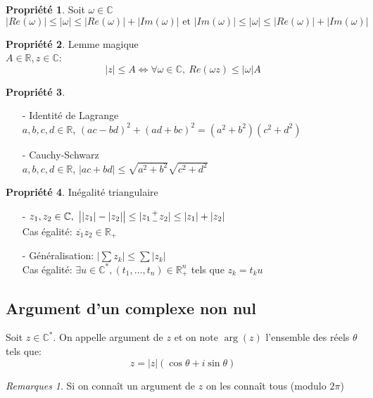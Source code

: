\documentclass[fleqn]{article}
\theoremstyle{definition} \newtheorem*{defi}{D\'efinition}
\theoremstyle{definition} \newtheorem*{theo}{Th\'eor\`eme}
\theoremstyle{definition} \newtheorem*{coro}{Corollaire}
\theoremstyle{remark} \newtheorem*{rqs}{Remarques}
\theoremstyle{definition} \newtheorem*{prop}{Propri\'et\'e}
\newcommand*{\bfrac}[2]{\genfrac{}{}{0pt}{}{#1}{#2}}
\begin{document}
\begin{prop} Soit $\omega \in \mathbb{C}$
	\[|Re(\omega)| \leq |\omega| \leq |Re(\omega)| + |Im(\omega)| \text{ et } |Im(\omega)| \leq |\omega| \leq |Re(\omega)| + |Im(\omega)|\]
\end{prop}

\begin{prop} Lemme magique \\
	$A \in \mathbb{R}, z \in \mathbb{C}$:
	\[|z| \leq A \Leftrightarrow \forall \omega \in \mathbb{C},\ Re(\omega z) \leq |\omega|A\]
\end{prop}

\begin{prop} $ $
	\begin{itemize}
		\item [-] Identit\'e de Lagrange \\
			$a,b,c,d \in \mathbb{R}$, $(ac - bd)^2 + (ad + bc)^2 = (a^2 + b^2)(c^2 + d^2)$
		\item [-] Cauchy-Schwarz \\
			$a,b,c,d \in \mathbb{R}$, $|ac + bd| \leq \sqrt{a^2 + b^2} \sqrt{c^2 + d^2}$
	\end{itemize}
\end{prop}

\begin{prop} In\'egalit\'e triangulaire
	\begin{itemize}
		\item [-] $z_1, z_2 \in \mathbb{C},\ \big||z_1| - |z_2|\big| \leq |z_1 \bfrac{+}{-} z_2| \leq |z_1| + |z_2|$ \\
			Cas \'egalit\'e: $\overline{z_1}z_2 \in \mathbb{R}_+$
		\item [-] G\'en\'eralisation: $|\sum z_k| \leq \sum |z_k|$ \\
			Cas \'egalit\'e: $\exists u \in \mathbb{C}^*, (t_1, \hdots, t_n) \in \mathbb{R}_+^n$ tels que $z_k = t_ku$
	\end{itemize}
\end{prop}

\subsection{Argument d'un complexe non nul}
Soit $z \in \mathbb{C}^*$. On appelle argument de $z$ et on note $\arg(z)$ l'ensemble des r\'eels $\theta$ tels que:
\[z = |z|(\cos \theta + i \sin \theta)\]
\begin{rqs}
	Si on conna\^it un argument de $z$ on les conna\^it tous (modulo $2\pi$)
\end{rqs}
\end{document}
